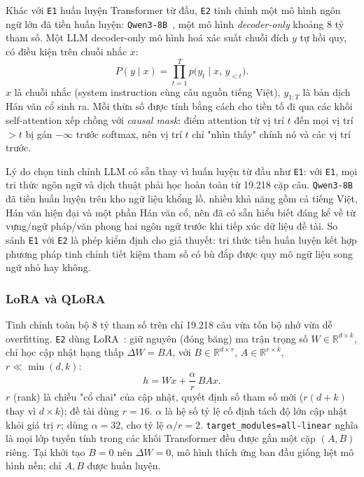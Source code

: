 Khác với \texttt{E1} huấn luyện Transformer từ đầu, \texttt{E2} tinh chỉnh một mô hình
ngôn ngữ lớn đã tiền huấn luyện: \texttt{Qwen3-8B}~\cite{qwenteam2025qwen3}, một mô hình
\textit{decoder-only} khoảng 8 tỷ tham số. Một LLM decoder-only mô hình hoá xác suất
chuỗi đích $y$ tự hồi quy, có điều kiện trên chuỗi nhắc $x$:
\begin{equation}
  P(y \mid x) = \prod_{t=1}^{T} p\bigl(y_t \mid x,\, y_{<t}\bigr).
  \label{eq:e2-causal-lm}
\end{equation}
$x$ là chuỗi nhắc (system instruction cùng câu nguồn tiếng Việt), $y_{1:T}$ là bản dịch
Hán văn cổ sinh ra. Mỗi thừa số được tính bằng cách cho tiền tố đi qua các khối
self-attention xếp chồng với \textit{causal mask}: điểm attention từ vị trí $t$ đến mọi
vị trí $>t$ bị gán $-\infty$ trước softmax, nên vị trí $t$ chỉ "nhìn thấy" chính nó và
các vị trí trước.

Lý do chọn tinh chỉnh LLM có sẵn thay vì huấn luyện từ đầu như \texttt{E1}: với
\texttt{E1}, mọi tri thức ngôn ngữ và dịch thuật phải học hoàn toàn từ 19.218 cặp câu.
\texttt{Qwen3-8B} đã tiền huấn luyện trên kho ngữ liệu khổng lồ, nhiều khả năng gồm cả
tiếng Việt, Hán văn hiện đại và một phần Hán văn cổ, nên đã có sẵn hiểu biết đáng kể về
từ vựng/ngữ pháp/văn phong hai ngôn ngữ trước khi tiếp xúc dữ liệu đề tài. So sánh
\texttt{E1} với \texttt{E2} là phép kiểm định cho giả thuyết: tri thức tiền huấn luyện
kết hợp phương pháp tinh chỉnh tiết kiệm tham số có bù đắp được quy mô ngữ liệu song ngữ
nhỏ hay không.

\subsubsection{LoRA và QLoRA}

Tinh chỉnh toàn bộ 8 tỷ tham số trên chỉ 19.218 câu vừa tốn bộ nhớ vừa dễ overfitting.
\texttt{E2} dùng LoRA~\cite{hu2021lora}: giữ nguyên (đóng băng) ma trận trọng số
$W \in \mathbb{R}^{d\times k}$, chỉ học cập nhật hạng thấp $\Delta W = BA$, với
$B\in\mathbb{R}^{d\times r}$, $A\in\mathbb{R}^{r\times k}$, $r \ll \min(d,k)$:
\begin{equation}
  h = Wx + \frac{\alpha}{r}\,BAx.
  \label{eq:e2-lora}
\end{equation}
$r$ (rank) là chiều "cổ chai" của cập nhật, quyết định số tham số mới ($r(d+k)$ thay vì
$d\times k$); đề tài dùng $r=16$. $\alpha$ là hệ số tỷ lệ cố định tách độ lớn cập nhật
khỏi giá trị $r$; dùng $\alpha=32$, cho tỷ lệ $\alpha/r=2$. \texttt{target\_modules=all-linear}
nghĩa là mọi lớp tuyến tính trong các khối Transformer đều được gắn một cặp $(A,B)$
riêng. Tại khởi tạo $B=0$ nên $\Delta W=0$, mô hình thích ứng ban đầu giống hệt mô hình
nền; chỉ $A,B$ được huấn luyện.

